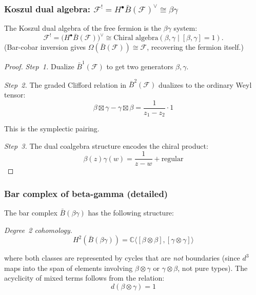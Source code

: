 \subsubsection{\texorpdfstring{Koszul dual algebra: $\mathcal{F}^! = H^\bullet\bar{B}(\mathcal{F})^\vee \cong \beta\gamma$}{Koszul dual algebra: F! = H(B(F))v = beta-gamma}}

\begin{theorem}
\label{thm:cobar-betagamma}
The Koszul dual algebra of the free fermion is the $\beta\gamma$ system:
\[\mathcal{F}^! =
\bigl(H^\bullet\bar{B}(\mathcal{F})\bigr)^\vee
\cong \text{Chiral algebra}(\beta, \gamma \mid [\beta,\gamma] = 1).\]
(Bar-cobar inversion gives $\Omega(\bar{B}(\mathcal{F})) \cong \mathcal{F}$, recovering the fermion itself.)
\end{theorem}

\begin{proof}
\emph{Step~1.} Dualize $\bar{B}^1(\mathcal{F})$ to get two generators $\beta, \gamma$.

\emph{Step~2.} The graded Clifford relation in
$\bar{B}^2(\mathcal{F})$ dualizes to the ordinary Weyl tensor:
\[\beta \boxtimes \gamma - \gamma \boxtimes \beta = \frac{1}{z_1-z_2} \cdot 1\]

This is the symplectic pairing.

\emph{Step~3.} The dual coalgebra structure encodes the chiral product:
\[\beta(z)\gamma(w) = \frac{1}{z-w} + \text{regular}\]
\end{proof}

\subsubsection{Bar complex of beta-gamma (detailed)}

\begin{proposition}[\ClaimStatusProvedHere]
\label{prop:betagamma-bar-deg2}
The bar complex $\bar{B}(\beta\gamma)$ has the following structure:

\emph{Degree~2 cohomology.}
\[H^2(\bar{B}(\beta\gamma)) = \mathbb{C}\langle [\beta \otimes \beta], [\gamma \otimes \gamma] \rangle\]

where both classes are represented by cycles that are \emph{not} boundaries (since $d^3$ maps into the span of elements involving $\beta \otimes \gamma$ or $\gamma \otimes \beta$, not pure types). The acyclicity of mixed terms follows from the relation:
\[d(\beta \otimes \gamma) = 1\]
\end{proposition}

